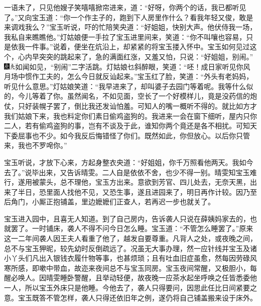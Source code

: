一语未了，只见他嫂子笑嘻嘻掀帘进来，道：``好呀，你两个的话，我已都听见了。''又向宝玉道：``你一个作主子的，跑到下人房里作什么？看我年轻又俊，敢是来调戏我么？''宝玉听说，吓的忙陪笑央道：``好姐姐，快别大声。他伏侍我一场，我私自来瞧瞧他。''灯姑娘便一手拉了宝玉进里间来，笑道：``你不叫嚷也容易，只是依我一件事。''说着，便坐在炕沿上，却紧紧的将宝玉搂入怀中。宝玉如何见过这个，心内早突突的跳起来了，急的满面红涨，又羞又怕，只说：``好姐姐，别闹。''{\includegraphics[width=3mm]{../Images/00004}\includegraphics[width=3mm]{../Images/00012}\footnotesize \kaishu 如闻如见，``别闹''二字活跳。}灯姑娘乜斜醉眼，笑道：``呸！成日家听见你风月场中惯作工夫的，怎么今日就反讪起来。''宝玉红了脸，笑道：``外头有老妈妈，听见什么意思。''灯姑娘笑道：``我早进来了，却叫婆子去园门等着呢。我等什么似的，今儿等着了你。虽然闻名，不如见面，空长了一个好模样儿，竟是没药信的炮仗，只好装幌子罢了，倒比我还发讪怕羞。可知人的嘴一概听不得的。就比如方才我们姑娘下来，我也料定你们素日偷鸡盗狗的。我进来一会在窗下细听，屋内只你二人，若有偷鸡盗狗的事，岂有不谈及于此，谁知你两个竟还是各不相扰。可知天下委屈事也不少。如今我反后悔错怪了你们。既然如此，你但放心。以后你只管来，我也不罗唣你。''

宝玉听说，才放下心来，方起身整衣央道：``好姐姐，你千万照看他两天。我如今去了。''说毕出来，又告诉晴雯。二人自是依依不舍，也少不得一别。晴雯知宝玉难行，遂用被蒙头，总不理他，宝玉方出来。意欲到芳官、四儿处去，无奈天黑，出来了半日，恐里面人找他不见，又恐生事，遂且进园来了，明日再作计较。因乃至后角门，小厮正抱铺盖，里边嬷嬷们正查人，若再迟一步也就关了。

宝玉进入园中，且喜无人知道。到了自己房内，告诉袭人只说在薛姨妈家去的，也就罢了。一时铺床，袭人不得不问今日怎么睡。宝玉道：``不管怎么睡罢了。''原来这一二年间袭人因王夫人看重了他了，越发自要尊重。凡背人之处，或夜晚之间，总不与宝玉狎昵，较先幼时反倒疏远了。况虽无大事办理，然一应针线并宝玉及诸小丫头们凡出入银钱衣履什物等事，也甚烦琐；且有吐血旧症虽愈，然每因劳碌风寒所感，即嗽中带血，故迩来夜间总不与宝玉同房。宝玉夜间常醒，又极胆小，每醒必唤人。因晴雯睡卧警醒，且举动轻便，故夜晚一应茶水起坐呼唤之任皆悉委他一人，所以宝玉外床只是他睡。今他去了，袭人只得要问，因思此任比日间紧要之意。宝玉既答不管怎样，袭人只得还依旧年之例，遂仍将自己铺盖搬来设于床外。

